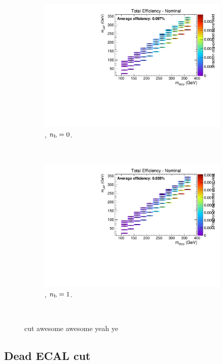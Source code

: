 \begin{figure}[h!]
\begin{subfigure}[b]{0.4\textwidth}
    \includegraphics[width=\textwidth, page=3]{Figs/sms/t2cc/v24/MHT_MET_T2cc_v24_eq0b_ge4j_incl.pdf}
    \caption{\njhigh, $n_{\text{b}} = 0$.}
  \end{subfigure}\\
  \begin{subfigure}[b]{0.4\textwidth}
    \includegraphics[width=\textwidth, page=3]{Figs/sms/t2cc/v24/MHT_MET_T2cc_v24_eq1b_ge4j_incl.pdf}
    \caption{\njhigh, $n_{\text{b}} = 1$.}
  \end{subfigure}\\
  \caption{\mhtmet cut awesome awesome yeah ye}
  \label{fig:sms-mhtmet-t2cc}
\end{figure}


\newpage
\subsection*{Dead ECAL cut}

